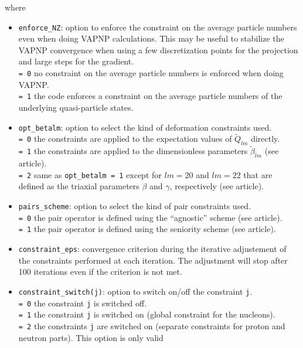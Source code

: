 \documentclass[a4paper,11pt]{article}
\newcommand{\ttt}[1]{\texttt{#1}}
\begin{document}
\pagebreak
where 
\begin{itemize}
\item \ttt{enforce\_NZ}: option to enforce the constraint on the average particle numbers even when doing VAPNP calculations. This may
  be useful to stabilize the VAPNP convergence when using a few discretization points for the projection and large steps for the gradient.\\[0.05cm]
  \ttt{= 0\:} no constraint on the average particle numbers is enforced when doing VAPNP. \\[0.05cm]
  \ttt{= 1\:} the code enforces a constraint on the average particle numbers of the underlying quasi-particle states.
\item \ttt{opt\_betalm}: option to select the kind of deformation constraints used. \\[0.05cm]
  \ttt{= 0\:} the constraints are applied to the expectation values of $\tilde{Q}_{lm}$ directly. \\[0.05cm]
  \ttt{= 1\:} the constraints are applied to the dimensionless parameters $\tilde{\beta}_{lm}$ (see article). \\[0.05cm]
  \ttt{= 2\:} same as \ttt{opt\_betalm = 1} except for $lm=20$ and $lm=22$ that are defined as the triaxial parameters
              $\beta$ and $\gamma$, respectively (see article).
\item \ttt{pairs\_scheme}: option to select the kind of pair constraints used. \\[0.05cm]
  \ttt{= 0\:} the pair operator is defined using the ``agnostic'' scheme (see article).  \\[0.05cm]
  \ttt{= 1\:} the pair operator is defined using the seniority scheme (see article).  %
\item \ttt{constraint\_eps}: convergence criterion during the iterative adjustement of the constraints performed at each iteration. 
  The adjustment will stop after 100 iterations even if the criterion is not met.
\item \ttt{constraint\_switch(j)}: option to switch on/off the constraint \ttt{j}. \\[0.05cm]
  \ttt{= 0\:} the constraint \ttt{j} is switched off. \\[0.05cm]
  \ttt{= 1\:} the constraint \ttt{j} is switched on (global constraint for the nucleons). \\[0.05cm]
  \ttt{= 2\:} the constraints \ttt{j} are switched on (separate constraints for proton and neutron parts). This option is only valid 

\end{itemize}
\end{document}
